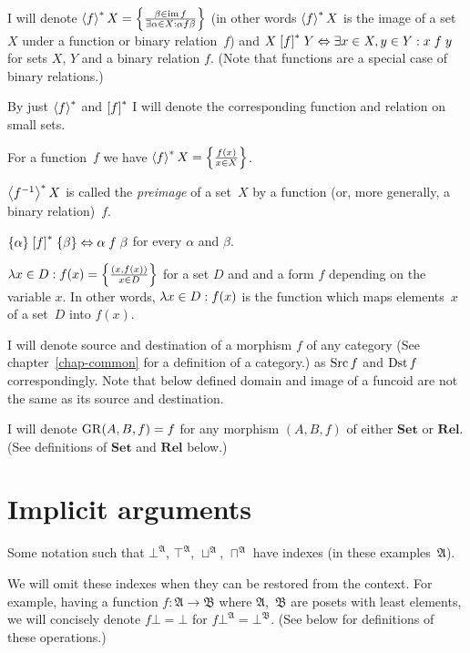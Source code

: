 I will denote $\left\langle f\right\rangle ^{\ast}X=\left\{ \frac{\beta\in\operatorname{im} f}{\exists\alpha\in X:\alpha\mathrel f\beta}\right\}$
(in other words $\left\langle f\right\rangle ^{\ast}X$ is the image of a set~$X$ under a function or binary relation~$f$)
and $X\mathrel{\left[f\right]^{\ast}}Y\Leftrightarrow\exists x\in X,y\in Y:x\mathrel{f}y$
for sets $X$, $Y$ and a binary relation $f$. (Note that functions
are a special case of binary relations.)

By just $\left\langle f\right\rangle ^{\ast}$ and $\mathrel{\left[f\right]^{\ast}}$ I will denote the corresponding
function and relation on small sets.

\begin{obvious}
For a function~$f$ we have $\left\langle f\right\rangle ^{\ast}X = \left\{ \frac{f(x)}{x\in X}\right\}$.
\end{obvious}

\begin{defn}
$\left\langle f^{-1}\right\rangle ^{\ast}X$ is called the \emph{preimage} of a set~$X$ by a function (or, more generally, a binary relation)~$f$.
\end{defn}

\begin{obvious}
$\{\alpha\}\mathrel{\left[f\right]^{\ast}}\{\beta\}\Leftrightarrow\alpha\mathrel f\beta$
for every $\alpha$ and $\beta$.
\end{obvious}
$\lambda x\in D:f(x)=\left\{ \frac{(x,f(x))}{x\in D}\right\}$ for a set $D$ and
and a form $f$ depending on the variable $x$.
In other words, $\lambda x\in D:f(x)$ is the function which maps elements~$x$ of a set~$D$ into $f(x)$.

I will denote source and destination of a morphism $f$ of any category
(See chapter~\ref{chap-common} for a definition of a category.)
as $\operatorname{Src} f$ and $\operatorname{Dst} f$ correspondingly. Note that below defined
domain and image of a funcoid are not the same as its source and destination.

I will denote $\operatorname{GR}(A,B,f)=f$ for any morphism $(A,B,f)$ of either
$\mathbf{Set}$ or $\mathbf{Rel}$. (See definitions of $\mathbf{Set}$
and $\mathbf{Rel}$ below.)

\section{Implicit arguments}

Some notation such that $\bot^{\mathfrak{A}}$, $\top^{\mathfrak{A}}$,
$\sqcup^{\mathfrak{A}}$, $\sqcap^{\mathfrak{A}}$ have indexes (in these examples~$\mathfrak{A}$).

We will omit these indexes when they can be restored from the context. For example,
having a function $f:\mathfrak{A}\rightarrow\mathfrak{B}$ where $\mathfrak{A}$,~$\mathfrak{B}$
are posets with least elements, we will concisely denote $f\bot = \bot$ for $f\bot^{\mathfrak{A}} = \bot^{\mathfrak{B}}$.
(See below for definitions of these operations.)

